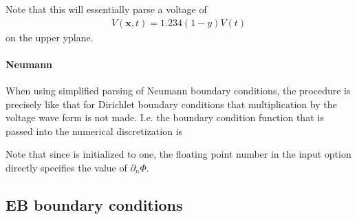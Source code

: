 \documentclass[letterpaper,10pt,english]{sphinxmanual}
\begin{document}
\sphinxAtStartPar
Note that this will essentially parse a voltage of
\begin{equation*}
\begin{split}V(\mathbf{x},t) = 1.234(1-y)V(t)\end{split}
\end{equation*}
\sphinxAtStartPar
on the upper y\sphinxhyphen{}plane.


\paragraph{Neumann}
\label{\detokenize{Solvers/Electrostatics:neumann}}
\sphinxAtStartPar
When using simplified parsing of Neumann boundary conditions, the procedure is precisely like that for Dirichlet boundary conditions  that multiplication by the voltage wave form is not made.
I.e. the boundary condition function that is passed into the numerical discretization is

\begin{sphinxVerbatim}[commandchars=\\\{\},formatcom=\scriptsize]
 

   \PYG{p}{[} \PYG{p}{]}        
       
\end{sphinxVerbatim}

\sphinxAtStartPar
Note that since  is initialized to one, the floating point number in the input option directly specifies the value of \(\partial_n\Phi\).


\subsection{EB boundary conditions}
\label{\detokenize{Solvers/Electrostatics:eb-boundary-conditions}}\label{\detokenize{Solvers/Electrostatics:chap-poissonebbc}}
\end{document}
